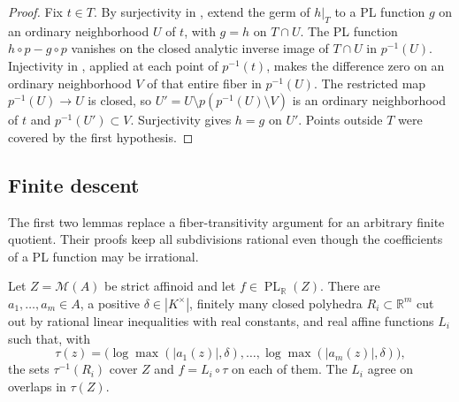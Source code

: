 \begin{proof}
Fix $t\in T$. By surjectivity in , extend the germ of $h|_T$ to a PL function $g$ on an ordinary neighborhood $U$ of $t$, with $g=h$ on $T\cap U$. The PL function $h\circ p-g\circ p$ vanishes on the closed analytic inverse image of $T\cap U$ in $p^{-1}(U)$. Injectivity in , applied at each point of $p^{-1}(t)$, makes the difference zero on an ordinary neighborhood $V$ of that entire fiber in $p^{-1}(U)$. The restricted map $p^{-1}(U)\to U$ is closed, so $U'=U\setminus p(p^{-1}(U)\setminus V)$ is an ordinary neighborhood of $t$ and $p^{-1}(U')\subset V$. Surjectivity gives $h=g$ on $U'$. Points outside $T$ were covered by the first hypothesis.
\end{proof}

\subsection{Finite descent}\label{sec:supplied-p061-finite-descent}

The first two lemmas replace a fiber-transitivity argument for an arbitrary finite quotient. Their proofs keep all subdivisions rational even though the coefficients of a PL function may be irrational.

\begin{lemma}\label{lem:supplied-p061-bounded-tropical-presentation}
Let $Z=\mathcal M(A)$ be strict affinoid and let $f\in\operatorname{PL}_{\mathbb R}(Z)$. There are $a_1,\ldots,a_m\in A$, a positive $\delta\in|K^\times|$, finitely many closed polyhedra $R_i\subset\mathbb R^m$ cut out by rational linear inequalities with real constants, and real affine functions $L_i$ such that, with
\[
 \tau(z)=\bigl(\log\max(|a_1(z)|,\delta),\ldots,\log\max(|a_m(z)|,\delta)\bigr),
\]
the sets $\tau^{-1}(R_i)$ cover $Z$ and $f=L_i\circ\tau$ on each of them. The $L_i$ agree on overlaps in $\tau(Z)$.
\end{lemma}

